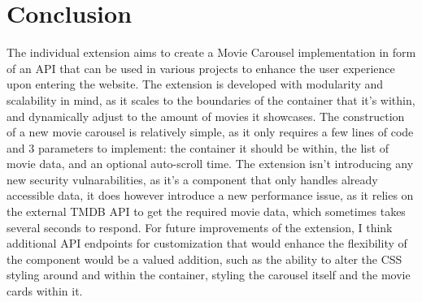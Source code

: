 \documentclass[letterpaper,twocolumn]{article}
\begin{document}
\section{Conclusion}
The individual extension aims to create a Movie Carousel implementation in form of an API that can be used in various projects to enhance the user experience upon entering the website. 
The extension is developed with modularity and scalability in mind, as it scales to the boundaries of the container that it's within, and dynamically adjust to the amount of movies it showcases. 
The construction of a new movie carousel is relatively simple, as it only requires a few lines of code and 3 parameters to implement: the container it should be within, the list of movie data, and an optional auto-scroll time.
The extension isn't introducing any new security vulnarabilities, as it's a component that only handles already accessible data, it does however introduce a new performance issue, as it relies on the external TMDB API to get the required movie data, which sometimes takes several seconds to respond.
For future improvements of the extension, I think additional API endpoints for customization that would enhance the flexibility of the component would be a valued addition, such as the ability to alter the CSS styling around and within the container, styling the carousel itself and the movie cards within it.
\end{document}
